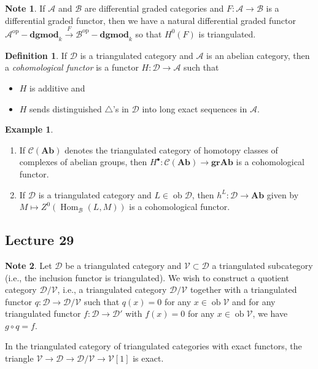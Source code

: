 \documentclass[10pt,letterpaper,cm]{nupset}
\theoremstyle{definition}
\newtheorem*{definition}{Definition}
\newtheorem{exmp}{Example}
\newtheorem{note}{Note}
\newcommand{\1}{\mathbf{1}}
\renewcommand{\a}{\mathscr{A}}
\renewcommand{\b}{\mathscr{B}}
\renewcommand{\d}{\mathscr{D}}
\renewcommand{\v}{\mathscr{V}}
\newcommand{\0}{\vec 0}
\DeclareMathOperator{\op}{op}
\DeclareMathOperator{\ob}{ob}
\DeclareMathOperator{\Hom}{Hom}
\begin{document}
\begin{note}
If $ \a$ and $\b$ are differential graded categories and $F: \a \to \b$ is a differential graded functor, then we have a natural differential graded functor $\a^{\op}{-}\mathbf{dgmod}_k \overset{F}{\longrightarrow} \b^{\op}{-}\mathbf{dgmod}_k$ so that $H^0(F)$ is triangulated.
\end{note}

\begin{definition}
If $\d$ is a triangulated category and $\a$ is an abelian category, then a \textit{cohomological functor} is a functor $H : \d \to \a$ such that 
\begin{itemize}
\item $H$ is additive and
\item  $H$ sends distinguished $\triangle$'s in $\d$ into long exact sequences in $\a$.
\end{itemize}
\end{definition}

\begin{exmp} $ $
\begin{enumerate}
\item If $\mathcal{C}(\mathbf{Ab})$ denotes the triangulated category of homotopy classes of complexes of abelian groups, then $H^{\bullet} : \mathcal{C}(\mathbf{Ab}) \to \mathbf{gr}\mathbf{Ab}$ is a cohomological functor.
\item If $\d$ is a triangulated category and $L \in \ob{\d}$, then $h^L : \d \to \mathbf{Ab}$ given by $M \mapsto Z^0(\Hom_{\b}(L, M))$ is a cohomological functor. 
\end{enumerate}
\end{exmp}

\subsection{Lecture 29}

\begin{note}
Let $\d$ be a triangulated category and $\v \subset \d$ a triangulated subcategory (i.e., the inclusion functor is triangulated). We wish to construct a quotient category $\d/\v$, i.e., a triangulated category $\d/\v$ together with a triangulated functor $q : \d \to \d/\v$ such that $q(x) = 0$ for any $x \in \ob{\v}$ and for any triangulated functor $f: \d \to \d'$ with $f(x) =0$ for any $x \in \ob{\v}$, we have $g \circ q= f$.

In the triangulated category of triangulated categories with exact functors, the triangle $\v \to \d \to \d/\v \to \v[1]$ is exact.
\end{note}
\end{document}
